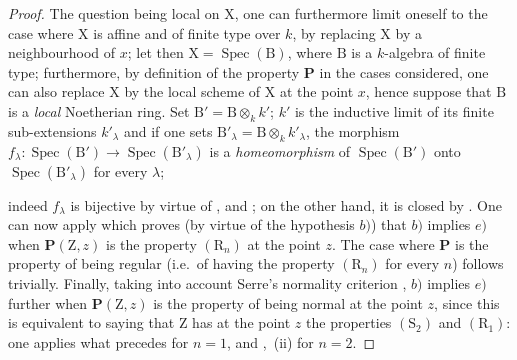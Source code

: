 \begin{proof}
The question being local on $\mathrm{X}$, one can furthermore limit oneself to the case where $\mathrm{X}$ is affine and of finite type over $k$, by replacing $\mathrm{X}$ by a neighbourhood of $x$; let then $\mathrm{X}=\operatorname{Spec}(\mathrm{B})$, where $\mathrm{B}$ is a $k$-algebra of finite type; furthermore, by definition of the property $\boldsymbol{P}$ in the cases considered, one can also replace $\mathrm{X}$ by the local scheme of $\mathrm{X}$ at the point $x$, hence suppose that $\mathrm{B}$ is a \emph{local} Noetherian ring. Set $\mathrm{B}'=\mathrm{B}\otimes_k k'$; $k'$ is the inductive limit of its finite sub-extensions $k'_\lambda$ and if one sets $\mathrm{B}'_\lambda=\mathrm{B}\otimes_k k'_\lambda$, the morphism $f_\lambda:\operatorname{Spec}(\mathrm{B}')\to\operatorname{Spec}(\mathrm{B}'_\lambda)$ is a \emph{homeomorphism} of $\operatorname{Spec}(\mathrm{B}')$ onto $\operatorname{Spec}(\mathrm{B}'_\lambda)$ for every $\lambda$;


indeed $f_\lambda$ is bijective by virtue of ,  and ; on the other hand, it is closed by . One can now apply  which proves (by virtue of the hypothesis $b)$) that $b)$ implies $e)$ when $\boldsymbol{P}(\mathrm{Z},z)$ is the property $(\mathrm{R}_n)$ at the point $z$. The case where $\boldsymbol{P}$ is the property of being regular (i.e.\ of having the property $(\mathrm{R}_n)$ for every $n$) follows trivially. Finally, taking into account Serre's normality criterion , $b)$ implies $e)$ further when $\boldsymbol{P}(\mathrm{Z},z)$ is the property of being normal at the point $z$, since this is equivalent to saying that $\mathrm{Z}$ has at the point $z$ the properties $(\mathrm{S}_2)$ and $(\mathrm{R}_1)$: one applies what precedes for $n=1$, and ,~(ii) for $n=2$.
\end{proof}

